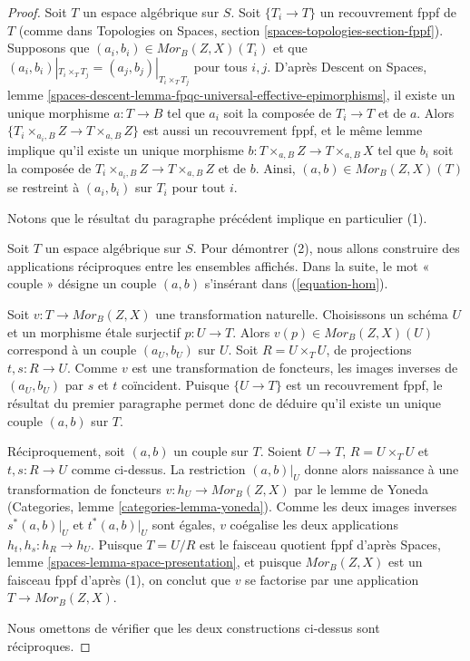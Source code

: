 \begin{proof}
Soit $T$ un espace algébrique sur $S$. Soit $\{T_i \to T\}$ un
recouvrement fppf de $T$ (comme dans
Topologies on Spaces, section \ref{spaces-topologies-section-fppf}).
Supposons que $(a_i, b_i) \in \mathit{Mor}_B(Z, X)(T_i)$ et
que $(a_i, b_i)|_{T_i \times_T T_j} = (a_j, b_j)|_{T_i \times_T T_j}$
pour tous $i, j$. D'après
Descent on Spaces,
lemme \ref{spaces-descent-lemma-fpqc-universal-effective-epimorphisms},
il existe un unique morphisme $a : T \to B$ tel que $a_i$ soit la
composée de $T_i \to T$ et de $a$. Alors
$\{T_i \times_{a_i, B} Z \to T \times_{a, B} Z\}$ est aussi un recouvrement
fppf, et le même lemme implique qu'il existe un unique morphisme
$b : T \times_{a, B} Z \to T \times_{a, B} X$ tel que $b_i$ soit la
composée de $T_i \times_{a_i, B} Z \to T \times_{a, B} Z$ et de $b$. Ainsi,
$(a, b) \in \mathit{Mor}_B(Z, X)(T)$ se restreint à $(a_i, b_i)$
sur $T_i$ pour tout $i$.

\medskip\noindent
Notons que le résultat du paragraphe précédent implique en particulier (1).

\medskip\noindent
Soit $T$ un espace algébrique sur $S$. Pour démontrer (2), nous allons
construire des applications réciproques entre les ensembles affichés. Dans la
suite, le mot « couple » désigne un couple $(a, b)$ s'insérant
dans (\ref{equation-hom}).

\medskip\noindent
Soit $v : T \to \mathit{Mor}_B(Z, X)$ une transformation naturelle.
Choisissons un schéma $U$ et un morphisme étale surjectif $p : U \to T$.
Alors $v(p) \in \mathit{Mor}_B(Z, X)(U)$ correspond à un couple $(a_U, b_U)$
sur $U$. Soit $R = U \times_T U$, de projections $t, s : R \to U$.
Comme $v$ est une transformation de foncteurs, les images inverses de
$(a_U, b_U)$ par $s$ et $t$ coïncident. Puisque $\{U \to T\}$ est un
recouvrement fppf, le résultat du premier paragraphe permet donc de
déduire qu'il existe un unique couple $(a, b)$ sur $T$.

\medskip\noindent
Réciproquement, soit $(a, b)$ un couple sur $T$.
Soient $U \to T$, $R = U \times_T U$ et $t, s : R \to U$ comme
ci-dessus. La restriction $(a, b)|_U$ donne alors naissance à une
transformation de foncteurs $v : h_U \to \mathit{Mor}_B(Z, X)$ par le
lemme de Yoneda
(Categories, lemme \ref{categories-lemma-yoneda}).
Comme les deux images inverses $s^*(a, b)|_U$ et $t^*(a, b)|_U$
sont égales, $v$ coégalise les deux applications
$h_t, h_s : h_R \to h_U$. Puisque $T = U/R$ est le faisceau quotient fppf d'après
Spaces, lemme \ref{spaces-lemma-space-presentation},
et puisque $\mathit{Mor}_B(Z, X)$ est un faisceau fppf d'après (1), on conclut
que $v$ se factorise par une application $T \to \mathit{Mor}_B(Z, X)$.

\medskip\noindent
Nous omettons de vérifier que les deux constructions ci-dessus sont
réciproques.
\end{proof}

